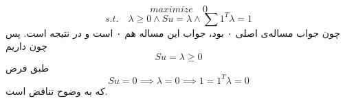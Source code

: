 \begin{enumerate}
\[
maximize \quad 0\]\[
s.t. \quad \lambda \ge 0 \land Su = \lambda \land \sum 1^T\lambda = 1
\]
چون جواب مساله‌ی اصلی ۰ بود، جواب این مساله هم ۰ است و در نتیجه
است.
پس چون داریم
\[
Su = \lambda \ge 0
\]
طبق فرض
\[
Su = 0 \implies \lambda = 0 \implies 1 = 1^T\lambda = 0 
\]
که به وضوح تناقض است.
\end{enumerate}